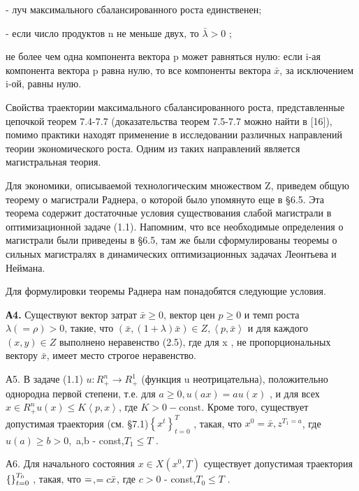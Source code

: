 \documentclass[12pt, 4paper]{book}
\begin{document}
{ - луч максимального сбалансированного роста единственен; 
\par

 - если число продуктов n не меньше двух, то $\bar{\lambda} > 0$ ; 
\par

не более чем одна компонента вектора p может равняться нулю: если i-ая компонента вектора p равна нулю, то все компоненты вектора $\bar{x}$, за исключением i-ой, равны нулю.
\par

Свойства траектории максимального сбалансированного роста, представленные цепочкой теорем 7.4-7.7 (доказательства теорем 7.5-7.7 можно найти в [16]), помимо практики находят применение в исследовании различных направлений теории экономического роста. Одним из таких направлений является магистральная теория.
\par

Для экономики, описываемой технологическим множеством Z, приведем общую теорему о магистрали Раднера, о которой было упомянуто еще в §6.5. Эта теорема содержит достаточные условия существования слабой магистрали в оптимизационной задаче (1.1). Напомним, что все необходимые определения о магистрали были приведены в §6.5, там же были сформулированы теоремы о сильных магистралях в динамических оптимизационных задачах Леонтьева и Неймана.
\par

Для формулировки теоремы Раднера нам понадобятся следующие условия.
\par

\textbf{А4.} Существуют вектор затрат $\bar{x} \geq 0$, вектор цен $p \geq 0$ и темп роста $\lambda (=\rho) > 0$, такие, что $(\bar{x},(1+ \lambda)\bar{x}) \in Z, \left\langle p,\bar{x} \right\rangle$ и для каждого $(x,y) \in Z$ выполнено неравенство (2.5), где для x , не пропорциональных вектору $\bar{x}$, имеет место строгое неравенство.
\par

А5. В задаче (1.1) $u:R_{+}^{n} \rightarrow R_{+}^{1}$ (функция u неотрицательна), положительно однородна первой степени, т.е. для  $a \geq 0 , u(ax)=au(x)$ , и для всех  $x \in R_{+}^{n} u(x) \leq K \left\langle p,x\right\rangle$, где $K > 0 - \text{const}$. Кроме того, существует допустимая траектория (см. §7.1)$\left\{x^t \right\}_{t=0}^{T}$ , такая, что $x^0 = \bar{x},z^{T_{1} = a } $, где $u(a) \geq b >0,$ a,b - const,$T_1 \leq T$ . 
\par

А6. Для начального состояния $x \in X(x^0,T)$ существует допустимая траектория $\left\{\title{x^t}\right\}_{t=0}^{T_0}$ , такая, что $\title{x^0} = \title{x}$,$\title{z^{T_0}}=c \bar{x} $, где $c > 0$ - const,$T_0 \leq T$ .
\par

}
\end{document}
